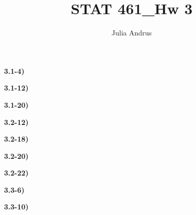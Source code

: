 \documentclass{article}
\title{STAT 461\_Hw 3}
\author{Julia Andrus}
\date{}
\begin{document}
\maketitle 



\textbf{ 3.1-4)}



\newpage

\textbf{ 3.1-12)}



\newpage

\textbf{ 3.1-20)}




\newpage

\textbf{ 3.2-12)}




\newpage

\textbf{  3.2-18)}





\newpage

\textbf{  3.2-20)}





\newpage

\textbf{  3.2-22)}





\newpage

\textbf{  3.3-6)}




 \newpage
 
\textbf{  3.3-10)}
\end{document}
